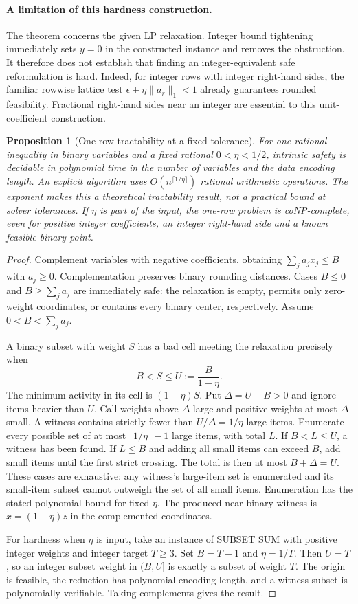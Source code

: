 \documentclass[11pt]{article}
\newtheorem{proposition}[theorem]{Proposition}
\begin{document}
\paragraph{A limitation of this hardness construction.}
The theorem concerns the given LP relaxation. Integer bound tightening immediately
sets $y=0$ in the constructed instance and removes the obstruction. It therefore
does not establish that finding an integer-equivalent safe reformulation is hard.
Indeed, for integer rows with integer right-hand sides, the familiar rowwise lattice
test $\epsilon+\eta\|a_r\|_1<1$ already guarantees rounded feasibility. Fractional
right-hand sides near an integer are essential to this unit-coefficient construction.

\begin{proposition}[One-row tractability at a fixed tolerance]\label{prop:one-row}
For one rational inequality in binary variables and a fixed rational
$0<\eta<1/2$, intrinsic safety is decidable in polynomial time in the number of
variables and the data encoding length. An explicit algorithm uses
$O(n^{\lceil1/\eta\rceil})$ rational arithmetic operations. The exponent makes
this a theoretical tractability result, not a practical bound at solver tolerances.
If $\eta$ is part of the input, the one-row problem is coNP-complete, even for
positive integer coefficients, an integer right-hand side and a known feasible
binary point.
\end{proposition}
\begin{proof}
Complement variables with negative coefficients, obtaining
$\sum_j a_j x_j\le B$ with $a_j\ge0$. Complementation preserves binary rounding
distances. Cases $B\le0$ and $B\ge\sum_j a_j$ are immediately safe: the relaxation
is empty, permits only zero-weight coordinates, or contains every binary center,
respectively. Assume $0<B<\sum_j a_j$.

A binary subset with weight $S$ has a bad cell meeting the relaxation precisely when
\[
 B<S\le U:=\frac{B}{1-\eta}.
\]
The minimum activity in its cell is $(1-\eta)S$. Put $\Delta=U-B>0$ and ignore
items heavier than $U$. Call weights above $\Delta$ large and positive weights
at most $\Delta$ small. A witness contains strictly fewer than
$U/\Delta=1/\eta$ large items. Enumerate every possible set of at most
$\lceil1/\eta\rceil-1$ large items, with total $L$. If $B<L\le U$, a witness has
been found. If $L\le B$ and adding all small items can exceed $B$, add small
items until the first strict crossing. The total is then at most $B+\Delta=U$.
These cases are exhaustive: any witness's large-item set is enumerated and its
small-item subset cannot outweigh the set of all small items. Enumeration has
the stated polynomial bound for fixed $\eta$. The produced near-binary witness
is $x=(1-\eta)z$ in the complemented coordinates.

For hardness when $\eta$ is input, take an instance of SUBSET SUM with positive
integer weights and integer target $T\ge3$. Set $B=T-1$ and $\eta=1/T$.
Then $U=T$, so an integer subset weight in $(B,U]$ is exactly a subset of weight
$T$. The origin is feasible, the reduction has polynomial encoding length, and
a witness subset is polynomially verifiable. Taking complements gives the result.
\end{proof}
\end{document}

